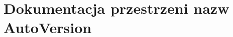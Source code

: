 \hypertarget{namespace_auto_version}{
\section{Dokumentacja przestrzeni nazw AutoVersion}
\label{namespace_auto_version}
}
